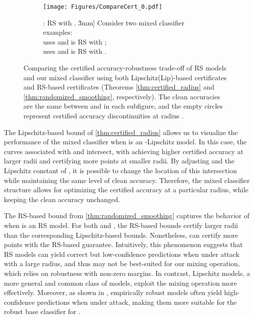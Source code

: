 \documentclass[11pt, letterpaper]{article}
\theoremstyle{plain}
\theoremstyle{definition}
\begin{document}
\begin{figure*}[t]
	\centering
	\begin{subfigure}[t]{.4\textwidth}
		\centering
		\captionsetup{justification=centering}
		\texttt{[image: Figures/CompareCert\_0.pdf]}
		\vspace{-6mm}
		\caption{: RS with . \hspace{14.3mm}  \.3mm]
		Consider two mixed classifier examples:  \\
		 uses  and  is RS with ;  \\
		 uses  and  is RS with . }
	\end{subfigure}
	\caption{Comparing the certified accuracy-robustness trade-off of RS models and our mixed classifier using both Lipschitz(Lip)-based certificates and RS-based certificates (Theorems \ref{thm:certified_radius} and \ref{thm:randomized_smoothing}, respectively). The clean accuracies are the same between  and  in each subfigure, and the empty circles represent certified accuracy discontinuities at radius .}
	\label{fig:certified_radii}
\end{figure*}

The Lipschitz-based bound of \cref{thm:certified_radius} allows us to visualize the performance of the mixed classifier  when  is an -Lipschitz model. In this case, the curves associated with  and  intersect, with  achieving higher certified accuracy at larger radii and  certifying more points at smaller radii. By adjusting  and the Lipschitz constant of , it is possible to change the location of this intersection while maintaining the same level of clean accuracy. Therefore, the mixed classifier structure allows for optimizing the certified accuracy at a particular radius, while keeping the clean accuracy unchanged.

The RS-based bound from \cref{thm:randomized_smoothing} captures the behavior of  when  is an RS model. For both  and , the RS-based bounds certify larger radii than the corresponding Lipschitz-based bounds. Nonetheless,  can certify more points with the RS-based guarantee. Intuitively, this phenomenon suggests that RS models can yield correct but low-confidence predictions when under attack with a large radius, and thus may not be best-suited for our mixing operation, which relies on robustness with non-zero margins. In contrast, Lipschitz models, a more general and common class of models, exploit the mixing operation more effectively. Moreover, as shown in , empirically robust models often yield high-confidence predictions when under attack, making them more suitable for the robust base classifier for .
\end{document}
